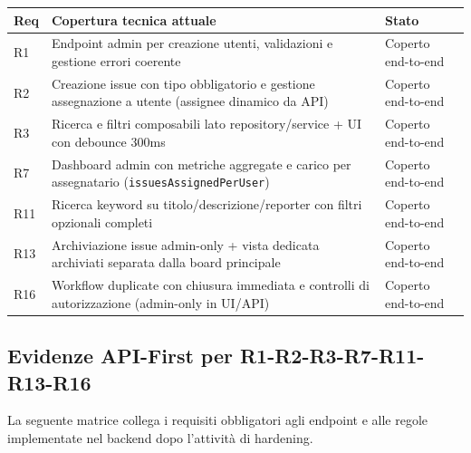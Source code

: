 ﻿\documentclass[11pt,a4paper]{article}
\begin{document}
\begin{tabularx}{\textwidth}{|l|X|X|}
    \hline
    \textbf{Req} & \textbf{Copertura tecnica attuale} & \textbf{Stato} \\ \hline
    R1 & Endpoint admin per creazione utenti, validazioni e gestione errori coerente & Coperto end-to-end \\ \hline
    R2 & Creazione issue con tipo obbligatorio e gestione assegnazione a utente (assignee dinamico da API) & Coperto end-to-end \\ \hline
    R3 & Ricerca e filtri composabili lato repository/service + UI con debounce 300ms & Coperto end-to-end \\ \hline
    R7 & Dashboard admin con metriche aggregate e carico per assegnatario (\texttt{issuesAssignedPerUser}) & Coperto end-to-end \\ \hline
    R11 & Ricerca keyword su titolo/descrizione/reporter con filtri opzionali completi & Coperto end-to-end \\ \hline
    R13 & Archiviazione issue admin-only + vista dedicata archiviati separata dalla board principale & Coperto end-to-end \\ \hline
    R16 & Workflow duplicate con chiusura immediata e controlli di autorizzazione (admin-only in UI/API) & Coperto end-to-end \\ \hline
\end{tabularx}

\subsection{Evidenze API-First per R1-R2-R3-R7-R11-R13-R16}
La seguente matrice collega i requisiti obbligatori agli endpoint e alle regole implementate nel backend dopo l'attività di hardening.
\end{document}
